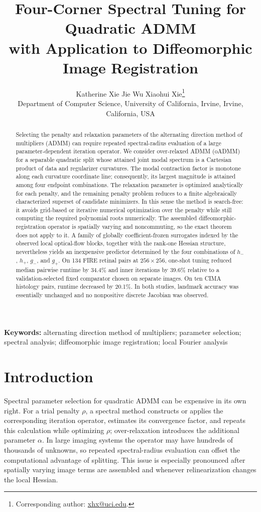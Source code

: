 \documentclass[11pt]{article}
\title{\textbf{Four-Corner Spectral Tuning for Quadratic ADMM\\
with Application to Diffeomorphic Image Registration}}
\author{Katherine Xie \qquad Jie Wu \qquad
Xiaohui Xie\thanks{Corresponding author:
\href{mailto:xhx@uci.edu}{xhx@uci.edu}.}\\
\normalsize Department of Computer Science, University of California, Irvine,
Irvine, California, USA}
\date{}
\theoremstyle{definition}
\begin{document}
\maketitle

\begin{abstract}
Selecting the penalty and relaxation parameters of the alternating direction
method of multipliers (ADMM) can require repeated spectral-radius evaluation
of a large parameter-dependent iteration operator. We consider over-relaxed
ADMM (oADMM) for a separable quadratic split whose attained joint modal
spectrum is a Cartesian product of data and regularizer curvatures. The modal
contraction factor is monotone along each curvature coordinate line;
consequently, its largest magnitude is attained among four endpoint
combinations. The relaxation
parameter is optimized analytically for each penalty, and the remaining
penalty problem reduces to a finite algebraically characterized superset of
candidate minimizers. In this sense the method is search-free: it avoids
grid-based or iterative numerical optimization over the penalty while still
computing the required polynomial roots numerically. The assembled
diffeomorphic-registration operator is spatially varying and noncommuting, so
the exact theorem does not apply to it. A family of globally coefficient-frozen
surrogates indexed by the observed local optical-flow blocks, together with
the rank-one Hessian structure, nevertheless yields an inexpensive predictor
determined by the four combinations of $h_-$, $h_+$, $g_-$, and $g_+$. On 134
FIRE retinal pairs at $256\times256$, one-shot tuning reduced median pairwise
runtime by 34.4\% and inner iterations by 39.6\% relative to a
validation-selected fixed comparator chosen on separate images. On ten CIMA histology pairs, runtime decreased by
20.1\%. In both studies, landmark accuracy was essentially unchanged and no
nonpositive discrete Jacobian was observed.
\end{abstract}

\noindent\textbf{Keywords:} alternating direction method of multipliers;
parameter selection; spectral analysis; diffeomorphic image registration;
local Fourier analysis

\section{Introduction}\label{sec:introduction}
Spectral parameter selection for quadratic ADMM can be expensive in its own
right. For a trial penalty $\rho$, a spectral method constructs or applies the
corresponding iteration operator, estimates its convergence factor, and
repeats this calculation while optimizing $\rho$; over-relaxation introduces
the additional parameter $\alpha$. In large imaging systems the operator may
have hundreds of thousands of unknowns, so repeated spectral-radius evaluation
can offset the computational advantage of splitting. This issue is especially
pronounced after spatially varying image terms are assembled and whenever
relinearization changes the local Hessian.
\end{document}

